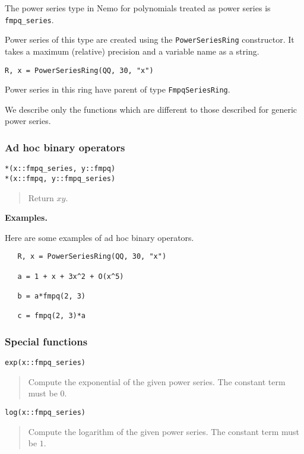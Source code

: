 \documentclass[a4paper,10pt]{article}
\newcommand{\code}{\lstinline}
\newcommand{\desc}[1]{\vspace{-3mm}\begin{quote}#1\end{quote}}
\begin{document}
{{The power series type in Nemo for polynomials treated as power series is
\code{fmpq_series}. 

Power series of this type are created using the \code{PowerSeriesRing} constructor.
It takes a maximum (relative) precision and a variable name as a string.

\begin{lstlisting}
R, x = PowerSeriesRing(QQ, 30, "x")
\end{lstlisting}

Power series in this ring have parent of type \code{FmpqSeriesRing}.

We describe only the functions which are different to those described for generic
power series.

\subsubsection{Ad hoc binary operators}

\begin{lstlisting}
*(x::fmpq_series, y::fmpq)
*(x::fmpq, y::fmpq_series)
\end{lstlisting}

\desc{Return $xy$.}

\textbf{Examples.}

Here are some examples of ad hoc binary operators.

\begin{lstlisting}
   R, x = PowerSeriesRing(QQ, 30, "x")

   a = 1 + x + 3x^2 + O(x^5)
   
   b = a*fmpq(2, 3)

   c = fmpq(2, 3)*a
\end{lstlisting}

\subsubsection{Special functions}

\begin{lstlisting}
exp(x::fmpq_series)
\end{lstlisting}

\desc{Compute the exponential of the given power series. The constant term must be $0$.}

\begin{lstlisting}
log(x::fmpq_series)
\end{lstlisting}

\desc{Compute the logarithm of the given power series. The constant term must be $1$.}

}}
\end{document}
